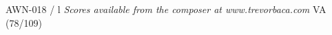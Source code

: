 \documentclass[11pt]{report}
\begin{document}
\null \vfill

AWN-018 / l \hfill
\textit{Scores available from the composer at www.trevorbaca.com}
\hfill VA (78/109)
\end{document}
